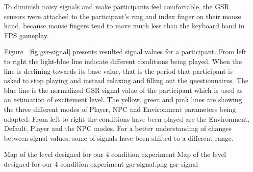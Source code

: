 \documentclass[conference]{IEEEtran}
\begin{document}
To diminish noisy signals and make participants feel comfortable, the GSR sensors were attached to the participant's ring and index finger on their mouse hand, because mouse fingers tend to move much less than the keyboard hand in FPS gameplay. 

Figure ~\ref{fig:gsr-signal} presents resulted signal values for a participant. From left to right the light-blue line indicate different conditions being played. When the line is declining towards its base value, that is the period that participant is asked to stop playing and instead relaxing and filling out the questionnaires. The blue line is the normalized GSR signal value of the participant which is used as an estimation of excitement level. The yellow, green and pink lines are showing the three different modes of Player, NPC and Environment parameters being adapted. From left to right the conditions have been played are the Environment, Default, Player and the NPC modes. For a better understanding of changes between signal values, some of signals have been shifted to a different range.

\dcimg
{Map of the level designed for our 4 condition experiment}
{Map of the level designed for our 4 condition experiment}
{gsr-signal.png}
{gsr-signal}
\end{document}
